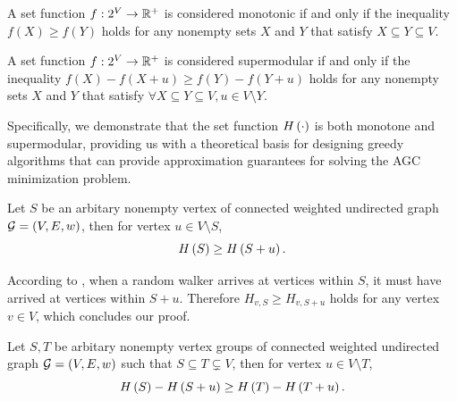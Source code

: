 \documentclass[10pt,journal,compsoc,twocolumn,twoside]{IEEEtran}
\begin{document}
\begin{definition}[Monotonicity]
    A set function \(f:2^{V}\to\mathbb{R}^+\) is considered monotonic if and only if the inequality \(f(X)\ge f(Y)\) holds for any nonempty sets \(X\) and \(Y\) that satisfy \(X\subseteq Y\subseteq V\).
\end{definition}

\begin{definition}[Supermodularity]
    A set function \(f:2^{V}\to\mathbb{R}^+\) is considered supermodular if and only if the inequality \(f(X)-f(X+u)\ge f(Y)-f(Y+u)\) holds for any nonempty sets \(X\) and \(Y\) that satisfy \(\forall X\subseteq Y\subseteq V, u\in V\setminus Y\).
\end{definition}

Specifically, we demonstrate that the set function \(H\left(\cdot\right)\) is both monotone and supermodular, providing us with a theoretical basis for designing greedy algorithms that can provide approximation guarantees for solving the AGC minimization problem.

\begin{theorem}\label{thm:mono}
    Let \(S\) be an arbitary nonempty vertex of connected weighted undirected graph \(\mathcal{G}=(V,E,w)\), then for vertex \(u\in V\setminus S\),
    \begin{equation*}
        H\left(S\right)\ge H\left(S+u\right).
    \end{equation*}
\end{theorem}

\begin{IEEEproof}
    According to , when a random walker arrives at vertices within \(S\), it must have arrived at vertices within \(S+u\). Therefore \(H_{v,S}\ge H_{v,S+u}\) holds for any vertex \(v\in V\), which concludes our proof.
\end{IEEEproof}

\begin{theorem}\label{thm:supermod}
    Let \(S,T\) be arbitary nonempty vertex groups of connected weighted undirected graph \(\mathcal{G}=(V,E,w)\) such that \(S\subseteq T\subsetneq V\), then for vertex \(u\in V\setminus T\),
    \begin{equation*}
        H\left(S\right)-H\left(S+u\right)\ge H\left(T\right)-H\left(T+u\right).
    \end{equation*}
\end{theorem}
\end{document}
